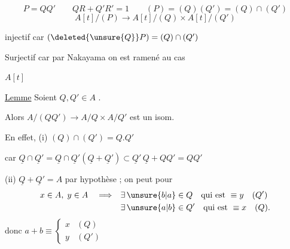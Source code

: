 \[
P=QQ' \qquad QR+Q'R'=1 \qquad (P)=(Q)(Q')=(Q)\cap(Q')
\]
\[
 A[t]/(P)\longrightarrow A[t]/(Q)\times A[t]/(Q')
\]

injectif car $(\deleted{\unsure{Q}}P)=(Q)\cap(Q')$

Surjectif car par Nakayama on est ramené au cas

$A[t]$

\uline{Lemme} Soient $Q,Q'\in A$  \uline{}.

Alors $A/(QQ')\longrightarrow A/Q\times A/Q'$ est un isom.

En effet, (i) $(Q)\cap(Q')=Q.Q'$

car $\underline Q\cap\underline Q'=\underline Q\cap\underline Q'(\underline Q+\underline Q')\subset
\underline Q'\,\underline Q+QQ'=QQ'$

(ii) $\underline Q+\underline Q'=A$ par hypothèse ; on peut pour
\[
\begin{aligned}
 x\in A,\;y\in A\quad\Longrightarrow\quad&\exists\,\unsure{b|a}\in Q\quad\text{qui est }\equiv y\quad(Q')\\
 &\exists\,\unsure{a|b}\in Q'\quad\text{qui est }\equiv x\quad(Q).
\end{aligned}
\]
donc $a+b\equiv\begin{cases}x&(Q)\\ y&(Q')\end{cases}$

